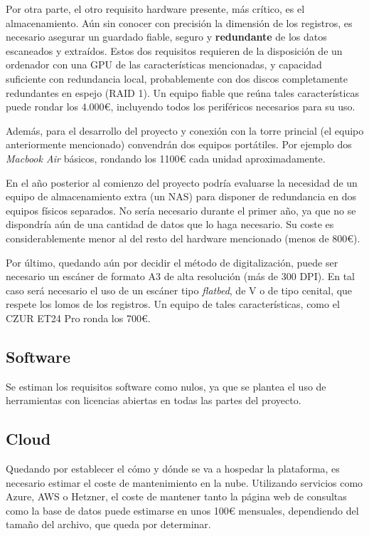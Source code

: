 \documentclass[11pt, a4paper]{article}
\begin{document}
Por otra parte, el otro requisito hardware presente, más crítico, es el
almacenamiento. Aún sin conocer con precisión la dimensión de los registros,
es necesario asegurar un guardado fiable, seguro y \textbf{redundante} de los
datos escaneados y extraídos. Estos dos requisitos requieren de la disposición
de un ordenador con una GPU de las características mencionadas, y capacidad
suficiente con redundancia local, probablemente con dos discos completamente
redundantes en espejo (RAID 1). Un equipo fiable que reúna tales características
puede rondar los 4.000€, incluyendo todos los periféricos necesarios para su uso.

Además, para el desarrollo del proyecto y conexión con la torre princial (el
equipo anteriormente mencionado) convendrán dos equipos portátiles. Por ejemplo
dos \textit{Macbook Air} básicos, rondando los 1100€ cada unidad aproximadamente.

En el año posterior al comienzo del proyecto podría evaluarse la necesidad de un
equipo de almacenamiento extra (un NAS) para disponer de redundancia en dos
equipos físicos separados. No sería necesario durante el primer año, ya que no se
dispondría aún de una cantidad de datos que lo haga necesario. Su coste es
considerablemente menor al del resto del hardware mencionado (menos de 800€).

Por último, quedando aún por decidir el método de digitalización, puede ser
necesario un escáner de formato A3 de alta resolución (más de 300 DPI). En tal
caso será necesario el uso de un escáner tipo \textit{flatbed}, de V o de tipo
cenital, que respete los lomos de los registros. Un equipo de tales
características, como el CZUR ET24 Pro ronda los 700€.

\subsection*{Software}
Se estiman los requisitos software como nulos, ya que se plantea el uso de
herramientas con licencias abiertas en todas las partes del proyecto.

\subsection*{Cloud}
Quedando por establecer el cómo y dónde se va a hospedar la plataforma, es necesario
estimar el coste de mantenimiento en la nube. Utilizando servicios como Azure, AWS
o Hetzner, el coste de mantener tanto la página web de consultas como la base de
datos puede estimarse en unos 100€ mensuales, dependiendo del tamaño del archivo,
que queda por determinar.
\end{document}
